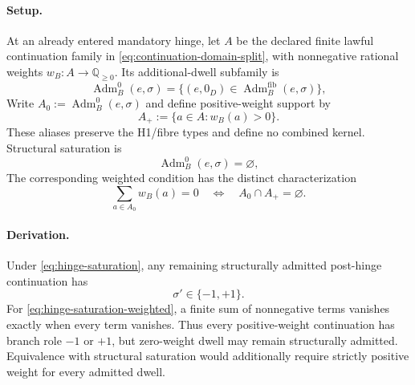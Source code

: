 \paragraph{Setup.}
At an already entered mandatory hinge, let \(A\) be the declared finite
lawful continuation family in \eqref{eq:continuation-domain-split}, with
nonnegative rational weights \(w_B:A\to\mathbb Q_{\ge0}\). Its
additional-dwell subfamily is
\begin{equation}
\operatorname{Adm}^{0}_{B}(e,\sigma)=
\{(e,0_D)\in\operatorname{Adm}^{\mathrm{fib}}_{B}(e,\sigma)\},
\label{eq:hinge-admissible-family}
\end{equation}
\label{subsec:fractal-jitter}
Write \(A_0:=\operatorname{Adm}^{0}_{B}(e,\sigma)\) and define positive-weight
support by
\begin{equation}
A_+:=\{a\in A:w_B(a)>0\}.
\label{eq:hinge-positive-support}
\end{equation}
These aliases preserve the H1/fibre types and define no combined kernel.
Structural saturation is
\begin{equation}
\operatorname{Adm}^{0}_{B}(e,\sigma)=\varnothing,
\label{eq:hinge-saturation}
\end{equation}
The corresponding weighted condition has the distinct characterization
\begin{equation}
\sum_{a\in A_0}w_B(a)=0
\quad\Longleftrightarrow\quad A_0\cap A_+=\varnothing.
\label{eq:hinge-saturation-weighted}
\end{equation}

\paragraph{Derivation.}
Under \eqref{eq:hinge-saturation}, any remaining structurally admitted
post-hinge continuation has
\begin{equation}
\sigma'\in\{-1,+1\}.
\label{eq:hinge-saturation-branch-continuation}
\end{equation}
For \eqref{eq:hinge-saturation-weighted}, a finite sum of nonnegative terms
vanishes exactly when every term vanishes. Thus every positive-weight
continuation has branch role \(-1\) or \(+1\), but zero-weight dwell may
remain structurally admitted.
Equivalence with structural saturation would additionally require strictly
positive weight for every admitted dwell.

